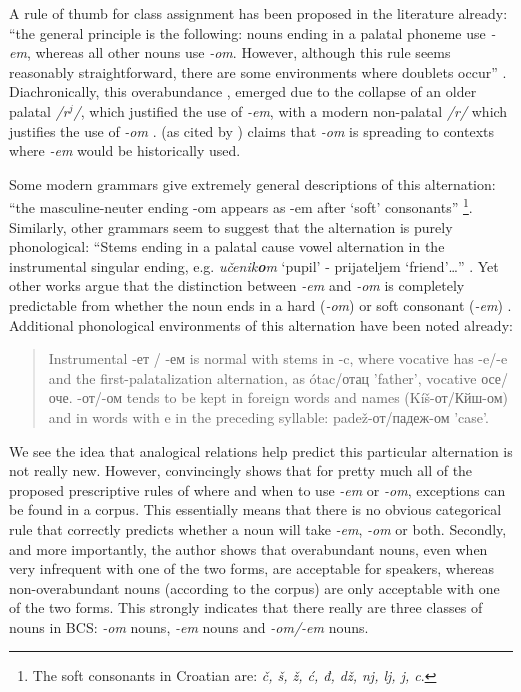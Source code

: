 A rule of thumb for class assignment has been proposed in the literature already: ``the general principle is the following: nouns ending in a palatal phoneme use \textit{-em}, whereas all other nouns use \textit{-om}. However, although this rule seems reasonably straightforward, there are some environments where doublets occur'' \autocite[p. 377]{Lecic.2015}. Diachronically, this overabundance \autocites{Thornton.2011, Thornton.2010a}, emerged due to the collapse of an older palatal \textit{/r$^j$/}, which justified the use of \textit{-em}, with a modern non-palatal \textit{/r/} which justifies the use of \textit{-om} \autocite{Lecic.2015}. \textcite{Mladenovic.1977} (as cited by \cite{Lecic.2015}) claims that \textit{-om} is spreading to contexts where \textit{-em} would be historically used.

Some modern grammars give extremely general descriptions of this alternation: ``the masculine-neuter ending -om appears as -em after `soft' consonants'' \autocite[p. 85]{Alexander.2006}\footnote{The soft consonants in Croatian are: \textit{č, š, ž, ć, đ, dž, nj, lj, j, c}.}. Similarly, other grammars seem to suggest that the alternation is purely phonological: ``Stems ending in a palatal cause vowel alternation in the instrumental singular ending, e.g. \textit{učenik\textbf{o}m} `pupil' - prijateljem `friend'\dots'' \autocite[p. 12]{Kordic.1997}. Yet other works argue that the distinction between \textit{-em} and \textit{-om} is completely predictable from whether the noun ends in a hard (\textit{-om}) or soft consonant (\textit{-em}) \autocite[p. 146]{Hammond.2005}. Additional phonological environments of this alternation have been noted already:

\begin{quotation}
Instrumental -ет / -ем is normal with stems in -c, where vocative has -e/-e and the first-palatalization alternation, as ótac/отац 'father', vocative осе/оче. -от/-ом tends to be kept in foreign words and names (Kíš-от/Кйш-ом) and in words with e in the preceding syllable: padež-от/падеж-ом 'case'. \autocite[p. 320]{Brown.1993}
\end{quotation}

We see the idea that analogical relations help predict this particular alternation is not really new. However,  \textcite{Lecic.2015} convincingly shows that for pretty much all of the proposed prescriptive rules of where and when to use \textit{-em} or \textit{-om}, exceptions can be found in a corpus. This essentially means that there is no obvious categorical rule that correctly predicts whether a noun will take \textit{-em}, \textit{-om} or both. Secondly, and more importantly, the author shows that overabundant nouns, even when very infrequent with one of the two forms, are acceptable for speakers, whereas non-overabundant nouns (according to the corpus) are only acceptable with one of the two forms. This strongly indicates that there really are three classes of nouns in BCS: \textit{-om} nouns, \textit{-em} nouns and \textit{-om/-em} nouns.

